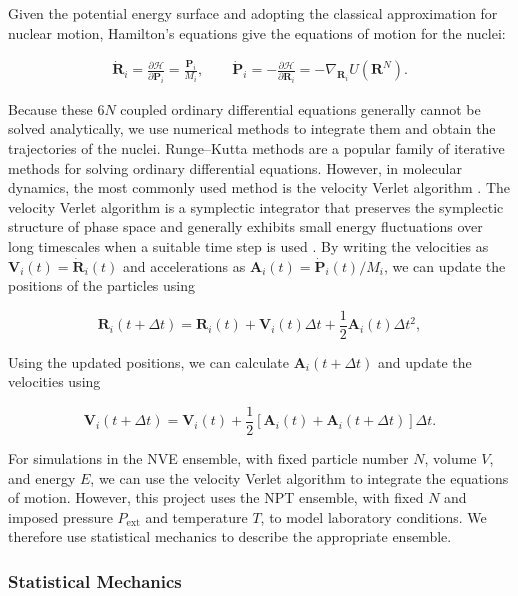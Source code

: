 \documentclass[12pt,a4paper]{article}
\numberwithin{equation}{section}
\begin{document}
Given the potential energy surface and adopting the classical approximation for nuclear motion,
Hamilton's equations give the equations of motion for the nuclei:

\begin{align}
  \dot{\bm R}_i=\frac{\partial\mathcal H}{\partial \bm P_i}=\frac{\bm P_i}{M_i}, \qquad
  \dot{\bm P}_i=-\frac{\partial\mathcal H}{\partial \bm R_i}=-\nabla_{\bm R_i}U(\bm R^N).
  \label{eq:classical-hamiltons-equations}
\end{align}

Because these $6N$ coupled ordinary differential equations generally cannot be solved analytically,
we use numerical methods to integrate them and obtain the trajectories of the nuclei.
Runge--Kutta methods are a popular family of iterative methods for solving ordinary differential equations.
However, in molecular dynamics, the most commonly used method is the velocity Verlet algorithm \cite{swope1982}.
The velocity Verlet algorithm is a symplectic integrator that preserves the symplectic structure of phase space
and generally exhibits small energy fluctuations over long timescales when a suitable time step is used \cite{allen2017}.
By writing the velocities as $\bm V_i(t)=\dot{\bm R}_i(t)$ and accelerations as $\bm A_i(t)=\dot{\bm P}_i(t)/M_i$,
we can update the positions of the particles using

\begin{equation}
  \bm R_i(t+\Delta t)=\bm R_i(t)+\bm V_i(t)\Delta t+\frac{1}{2}\bm A_i(t)\Delta t^2,
  \label{eq:verlet-position-update}
\end{equation}

Using the updated positions, we can calculate $\bm A_i(t+\Delta t)$ and update the velocities using

\begin{equation}
  \bm V_i(t+\Delta t)=\bm V_i(t)+\frac{1}{2}\left[\bm A_i(t)+\bm A_i(t+\Delta t)\right]\Delta t.
  \label{eq:verlet-velocity-update}
\end{equation}

For simulations in the NVE ensemble, with fixed particle number $N$, volume $V$, and energy $E$,
we can use the velocity Verlet algorithm to integrate the equations of motion.
However, this project uses the NPT ensemble, with fixed $N$ and imposed pressure $P_{\mathrm{ext}}$ and temperature $T$, to model laboratory conditions.
We therefore use statistical mechanics to describe the appropriate ensemble.

\subsubsection{Statistical Mechanics}
\label{sec:sm}
\end{document}
